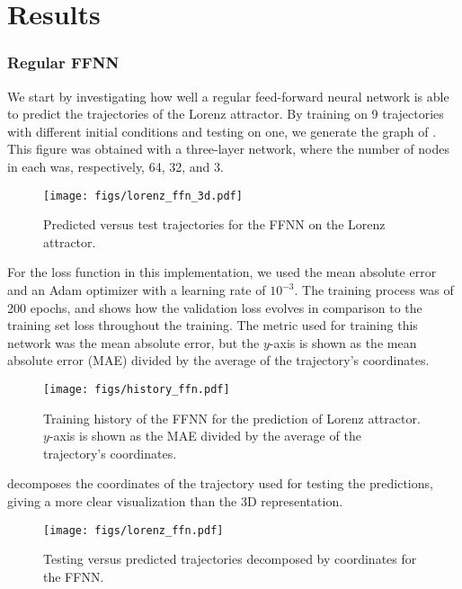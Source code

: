 \section{Results}\label{results}


\subsubsection{Regular FFNN} 

We start by investigating how well a regular feed-forward neural network is able to predict the trajectories of the Lorenz attractor. By training on 9 trajectories with different initial conditions and testing on one, we generate the graph of . This figure was obtained with a three-layer network, where the number of nodes in each was, respectively, 64, 32, and 3.


\begin{figure}[H]
\texttt{[image: figs/lorenz\_ffn\_3d.pdf]}
    \caption{Predicted versus test trajectories for the FFNN on the Lorenz attractor.}
    \label{fig:ffn_lorenz3d}
\end{figure}

For the loss function in this implementation, we used the mean absolute error and an Adam optimizer with a learning rate of $10^{-3}$. The training process was of 200 epochs, and  shows how the validation loss evolves in comparison to the training set loss throughout the training. The metric used for training this network was the mean absolute error, but the $y$-axis is shown as the mean absolute error (MAE) divided by the average of the trajectory's coordinates.

\begin{figure}[H]
\texttt{[image: figs/history\_ffn.pdf]}
    \caption{Training history of the FFNN for the prediction of Lorenz attractor. $y$-axis is shown as the MAE divided by the average of the trajectory's coordinates.}
    \label{fig:history_ffn}
\end{figure}

 decomposes the coordinates of the trajectory used for testing the predictions, giving a more clear visualization than the 3D representation. 

\begin{figure}[H]
\texttt{[image: figs/lorenz\_ffn.pdf]}
    \caption{Testing versus predicted trajectories decomposed by coordinates for the FFNN.}
    \label{fig:ffn_lorenz}
\end{figure}


